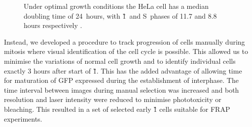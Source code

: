       \begin{figure}
        \centering
        \newcommand{\slice}[4]{
          \pgfmathparse{0.5*#1+0.5*#2}
          \let\midangle\pgfmathresult

          \draw[thick,fill=black!10] (0,0) -- (#1:1) arc (#1:#2:1) -- cycle;

          \node[label=\midangle:#4] at (\midangle:1) {};

          \pgfmathparse{min((#2-#1-10)/110*(-0.3),0)}
          \let\temp\pgfmathresult
          \pgfmathparse{max(\temp,-0.5) + 0.8}
          \let\innerpos\pgfmathresult
          \node at (\midangle:\innerpos) {#3};
        }
          {
            Under optimal growth conditions the HeLa cell has a median
            doubling time of 24~hours, with \G1~and
            S~phases of 11.7 and 8.8 hours respectively \citep{HeLaCellCycle}.
          }
        \label{fig:kill-frap:cell-cycle}
      \end{figure}

    Instead, we developed a procedure to track
    progression of cells manually during mitosis
    where visual identification of the cell cycle is possible.
    This allowed us to minimise the variations of normal cell growth
    and to identify individual cells exactly 3 hours after start of \G1{}.
    This has the added advantage of allowing time for maturation of GFP
    expressed during the establishment of interphase.
    The time interval between images during manual selection was increased and
    both resolution and laser intensity were reduced
    to minimise phototoxicity or bleaching.
    This resulted in a set of selected early \G1{}
    cells suitable for FRAP experiments.

